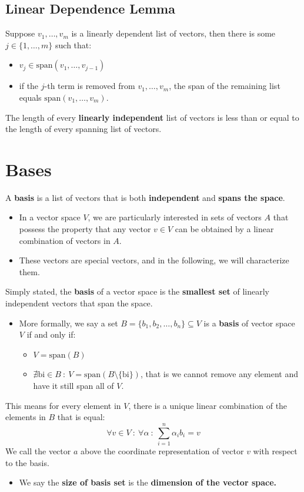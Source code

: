 \documentclass[10pt]{article}
\begin{document}
\subsection*{Linear Dependence Lemma}
Suppose $v_1, \dots, v_m$ is a linearly dependent list of vectors, then there is some $j \in \{1, \dots, m\}$ such that:
\begin{itemize}
	\item $v_j \in \text{span}(v_1, \dots, v_{j - 1})$
	\item if the $j$-th term is removed from $v_1, \dots, v_m$, the span of the remaining list equals $\text{span}(v_1, \dots, v_m)$.
\end{itemize}
The length of every \textbf{linearly independent} list of vectors is less than or equal to the length of every spanning list of vectors.

\section*{Bases}
A \textbf{basis} is a list of vectors that is both \textbf{independent} and \textbf{spans the space}.
\begin{itemize}
	\item In a vector space $V$, we are particularly interested in sets of vectors $A$ that possess the property that any vector $v \in V$ can be obtained by a linear combination of vectors in $A$.
	\item These vectors are special vectors, and in the following, we will characterize them.
\end{itemize}
Simply stated, the \textbf{basis} of a vector space is the \textbf{smallest set} of linearly independent vectors that span the space.
\begin{itemize}
	\item More formally, we say a set $B = \{b_1, b_2, \dots, b_n\} \subseteq V$ is a \textbf{basis} of vector space $V$ if and only if:
	\begin{itemize}
	    \item $V = \text{span}(B)$
	    \item $\nexists \text{bi} \in B \::\: V = \text{span}(B \setminus \{\text{bi}\})$, that is we cannot remove any element and have it still span all of $V$.
    \end{itemize}
\end{itemize}
This means for every element in $V$, there is a unique linear combination of the elements in $B$ that is equal:
\[\forall v \in V \::\: \forall \alpha \::\: \sum_{i = 1}^n \alpha_i b_i = v\]
We call the vector $a$ above the coordinate representation of vector $v$ with respect to the basis.
\begin{itemize}
	\item We say the \textbf{size of basis set} is the \textbf{dimension of the vector space.}
\end{itemize}
\end{document}
